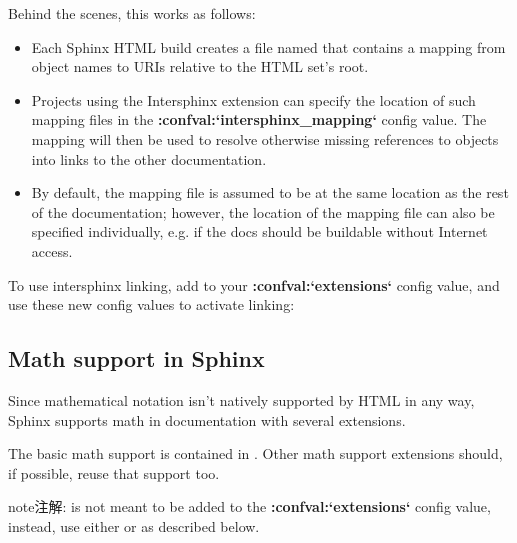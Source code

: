 \documentclass[letterpaper,10pt,english]{sphinxmanual}
\begin{document}
Behind the scenes, this works as follows:
\begin{itemize}
\item {} 
Each Sphinx HTML build creates a file named  that contains
a mapping from object names to URIs relative to the HTML set's root.

\item {} 
Projects using the Intersphinx extension can specify the location of such
mapping files in the {\color{red}\bfseries{}:confval:{}`intersphinx\_mapping{}`} config value.  The mapping
will then be used to resolve otherwise missing references to objects into
links to the other documentation.

\item {} 
By default, the mapping file is assumed to be at the same location as the rest
of the documentation; however, the location of the mapping file can also be
specified individually, e.g. if the docs should be buildable without Internet
access.

\end{itemize}

To use intersphinx linking, add  to your
{\color{red}\bfseries{}:confval:{}`extensions{}`} config value, and use these new config values to activate
linking:


\subsection{Math support in Sphinx}
\label{ext/math:module-sphinx.ext.mathbase}\label{ext/math:math-support-in-sphinx}\label{ext/math::doc}

Since mathematical notation isn't natively supported by HTML in any way, Sphinx
supports math in documentation with several extensions.

The basic math support is contained in {\hyperref[ext/math:module\string-sphinx.ext.mathbase]{}}. Other math
support extensions should, if possible, reuse that support too.

\begin{notice}{note}{注解:}
{\hyperref[ext/math:module\string-sphinx.ext.mathbase]{}} is not meant to be added to the {\color{red}\bfseries{}:confval:{}`extensions{}`} config
value, instead, use either {\hyperref[ext/math:module\string-sphinx.ext.pngmath]{}} or
{\hyperref[ext/math:module\string-sphinx.ext.mathjax]{}} as described below.
\end{notice}
\end{document}
